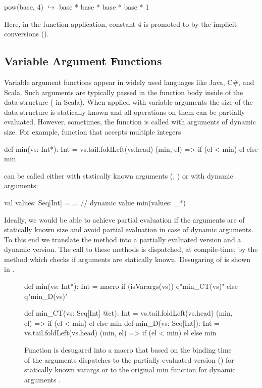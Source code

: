 \begin{lstparagraph}
pow(base, 4)
  $\hookrightarrow$ base * base * base * base * 1
\end{lstparagraph}

Here, in the function application, constant 4 is promoted to  by the implicit
conversions ().

\subsection{Variable Argument Functions}
\label{sct:varargs}

Variable argument functions appear in widely used languages like Java, C\#, and Scala.
 Such arguments are typically passed in the function body inside of the data structure
 (\eg {} in Scala). When applied with variable arguments the size of the
 data-structure is statically known and all operations on them can be partially
 evaluated. However, sometimes, the function is called with arguments of dynamic size.
 For example, function  that accepts multiple integers\begin{lstparagraph}
def min(vs: Int*): Int = vs.tail.foldLeft(vs.head) {
  (min, el) => if (el < min) el else min
}
\end{lstparagraph}can be called either with statically known arguments
 (\eg, ) or with dynamic arguments:\begin{lstparagraph}
val values: Seq[Int] = ... // dynamic value
min(values: _*)
\end{lstparagraph}

Ideally, we would be able to achieve partial evaluation if the arguments are of statically
known size and avoid partial evaluation in case of dynamic arguments. To this end we translate
the method  into a partially evaluated version and a dynamic version. The call to these
methods is dispatched, at compile-time, by the  method which checks if
arguments are statically known. Desugaring of  is shown in .

\begin{figure}
\begin{listing}
def min(vs: Int*): Int = macro
  if (isVarargs(vs)) q"min_CT(vs)"
  else q"min_D(vs)"

def min_CT(vs: Seq[Int] @ct): Int =
  vs.tail.foldLeft(vs.head) { (min, el) =>
  if (el < min) el else min
}
def min_D(vs: Seq[Int]): Int =
  vs.tail.foldLeft(vs.head) {
    (min, el) => if (el < min) el else min
  }
\end{listing}
\caption{Function  is desugared into a  macro that based on the
binding time of the arguments dispatches to the partially evaluated version ()
for statically known varargs or to the original min function for dynamic arguments .}
\label{fig:min}
\end{figure}

